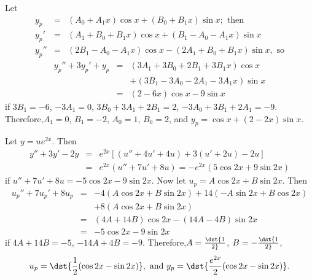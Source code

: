 \documentclass[dvips]{book}
\renewcommand{\exer}[1]{\par\medskip\;\noindent{\color{red}\bf #1.}}
\numberwithin{example}{section}
\numberwithin{equation}{section}
\numberwithin{theorem}{section}
\numberwithin{table}{section}
\numberwithin{figure}{section}
\begin{document}
\vspace*{-17.5pt}

\exer{5.5.2}
Let
\begin{eqnarray*}
y_p&=&(A_0+A_1x)\cos x+(B_0+B_1x)\sin x; \mbox{ then}\\
y_p'&=&(A_1+B_0+B_1x)\cos x+(B_1-A_0-A_1x)\sin x\\
y_p''&=&(2B_1-A_0-A_1x)\cos x-(2A_1+B_0+B_1x)\sin x, \mbox{ so}
\end{eqnarray*}
\begin{eqnarray*}
y_p''+3y_p'+y_p&=&(3A_1+3B_0+2B_1+3B_1x)\cos x \\
&&+(3B_1-3A_0-2A_1-3A_1x)\sin x \\
&=&(2-6x)\cos x-9\sin x
\end{eqnarray*}
if $3B_1=-6$, $-3A_1=0$, $3B_0+3A_1+2B_1=2$, $-3A_0+3B_1+2A_1=-9$.
Therefore,$A_1=0$,   $B_1=-2$, $A_0=1$, $B_0=2$, and
 $y_p=\cos x+(2-2x)\sin x$.


\exer{5.5.4}
Let $y=ue^{2x}$. Then
\begin{eqnarray*}
y''+3y'-2y&=&e^{2x}\left[(u''+4u'+4u)+3(u'+2u)-2u\right]\\
&=&e^{2x}(u''+7u'+8u)=-e^{2x}(5\cos2x+9\sin2x)
\end{eqnarray*}
if $u''+7u'+8u=-5\cos2x-9\sin2x$. Now let $u_p=A\cos2x+B\sin2x$. Then
\begin{eqnarray*}
u_p''+7u_p'+8u_p&=&-4(A\cos2x+B\sin2x)+14(-A\sin2x+B\cos2x)\\&&
+8(A\cos2x+B\sin2x)\\ &=&
(4A+14B)\cos2x-(14A-4B)\sin2x\\ &=&-5\cos2x-9\sin2x
\end{eqnarray*}
if $4A+14B=-5$, $-14A+4B=-9$. Therefore,$A=\dst{1\over2}$,
$B=-\dst{1\over2}$,
$$
 u_p=\dst{{1\over2}(\cos2x-\sin2x)}, \mbox{ and }
y_p=\dst{{e^{2x}\over2}(\cos2x-\sin2x)}.
$$
\end{document}
